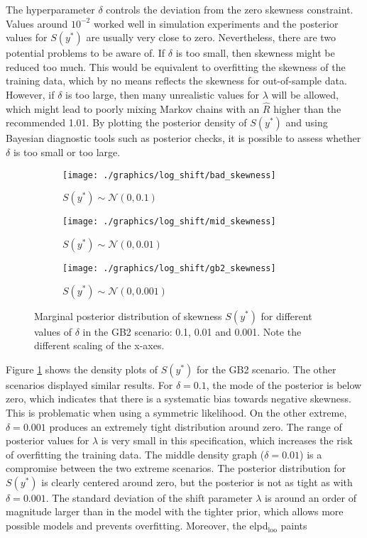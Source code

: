 The hyperparameter $\delta$ controls the deviation from the zero skewness constraint.
Values around $10^{-2}$ worked well in simulation experiments and the posterior values for $S(y^*)$ are usually very close to zero.
Nevertheless, there are two potential problems to be aware of.
If $\delta$ is too small, then skewness might be reduced too much.
This would be equivalent to overfitting the skewness of the training data, which by no means reflects the skewness for out-of-sample data.
However, if $\delta$ is too large, then many unrealistic values for $\lambda$ will be allowed, which might lead to poorly mixing Markov chains with an $\hat R$ higher than the recommended 1.01.
By plotting the posterior density of $S(y^*)$ and using Bayesian diagnostic tools such as posterior checks, it is possible to assess whether $\delta$ is too small or too large.


\begin{figure}[t]
    \centering
    \begin{subfigure}{0.32\linewidth}
        \texttt{[image: ./graphics/log\_shift/bad\_skewness]}
        \caption{$S(y^*) \sim \mathcal N (0, 0.1)$}
    \end{subfigure}
    \begin{subfigure}{0.32\linewidth}
        \texttt{[image: ./graphics/log\_shift/mid\_skewness]}
        \caption{$S(y^*) \sim \mathcal N (0, 0.01)$}
    \end{subfigure}
    \begin{subfigure}{0.32\linewidth}
        \texttt{[image: ./graphics/log\_shift/gb2\_skewness]}
        \caption{$S(y^*) \sim \mathcal N (0, 0.001)$}
    \end{subfigure}

    \caption[Marginal posterior distribution of skewness for different values of $\delta$.]{Marginal posterior distribution of skewness $S(y^*)$ for different values of $\delta$ in the GB2 scenario: 0.1, 0.01 and 0.001. Note the different scaling of the x-axes.}
    \label{fig:bad_skewness}
\end{figure}

Figure \ref{fig:bad_skewness} shows the density plots of $S(y^*)$ for the GB2 scenario.
The other scenarios displayed similar results.
For $\delta = 0.1$, the mode of the posterior is below zero, which indicates that there is a systematic bias towards negative skewness.
This is problematic when using a symmetric likelihood.
On the other extreme, $\delta = 0.001$ produces an extremely tight distribution around zero.
The range of posterior values for $\lambda$ is very small in this specification, which increases the risk of overfitting the training data.
The middle density graph ($\delta = 0.01$) is a compromise between the two extreme scenarios.
The posterior distribution for $S(y^*)$ is clearly centered around zero, but the posterior is not as tight as with $\delta = 0.001$.
The standard deviation of the shift parameter $\lambda$ is around an order of magnitude larger than in the model with the tighter prior, which allows more possible models and prevents overfitting.
Moreover, the elpd$_{\text{loo}}$ paints



